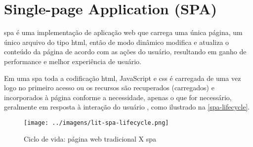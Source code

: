 \section{Single-page Application (SPA)}
\Gls{spa} é uma implementação de aplicação web que carrega uma única página, um único arquivo do tipo \ac{html}, então de modo dinâmico modifica e atualiza o conteúdo da página de acordo com as ações do usuário, resultando em ganho de performance e melhor experiência de usuário. \cite{spamozilla}

Em uma \ac{spa} toda a codificação \ac{html}, JavaScript e \acs{css} é carregada de uma vez logo no primeiro acesso ou os recursos são recuperados (carregados) e incorporados à página conforme a necessidade, apenas o que for necessário, geralmente em resposta à interação do usuário \cite{wikispa}, como ilustrado na \autoref{spa-lifecycle}.

\begin{figure}[H]
	\centering
	\caption{\label{spa-lifecycle}Ciclo de vida: página web tradicional X \acs{spa}}
	\texttt{[image: ../imagens/lit-spa-lifecycle.png]}
\end{figure}